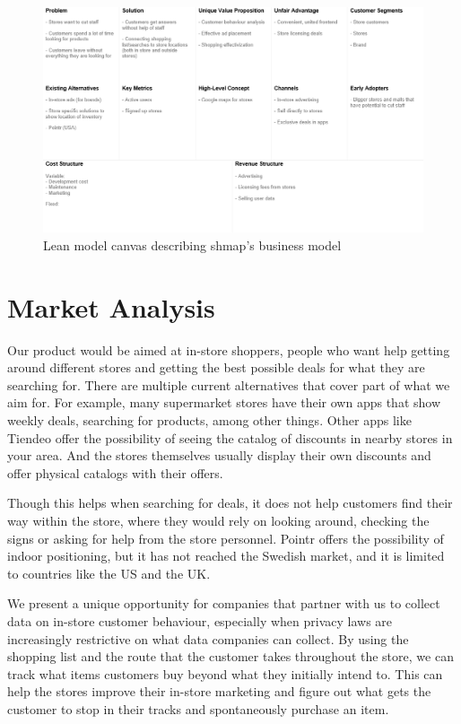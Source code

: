 \documentclass[titlepage]{article}
\def\companyName{shmap}
\begin{document}
\begin{figure}[h]
    \centering
    \includegraphics[width=1\textwidth]{lean model canvas.png}
    \caption{Lean model canvas describing \companyName's business model}
    \label{fig:lean-model-canvas}
\end{figure}

\section{Market Analysis}
Our product would be aimed at in-store shoppers, people who want help getting around different stores and getting the best possible deals for what they are searching for. There are multiple current alternatives that cover part of what we aim for. For example, many supermarket stores have their own apps that show weekly deals, searching for products, among other things. Other apps like Tiendeo offer the possibility of seeing the catalog of discounts in nearby stores in your area. And the stores themselves usually display their own discounts and offer physical catalogs with their offers. 

Though this helps when searching for deals, it does not help customers find their way within the store, where they would rely on looking around, checking the signs or asking for help from the store personnel. Pointr offers the possibility of indoor positioning, but it has not reached the Swedish market, and it is limited to countries like the US and the UK. 

We present a unique opportunity for companies that partner with us to collect data on in-store customer behaviour, especially when privacy laws are increasingly restrictive on what data companies can collect. By using the shopping list and the route that the customer takes throughout the store, we can track what items customers buy beyond what they initially intend to. This can help the stores improve their in-store marketing and figure out what gets the customer to stop in their tracks and spontaneously purchase an item.
\end{document}
